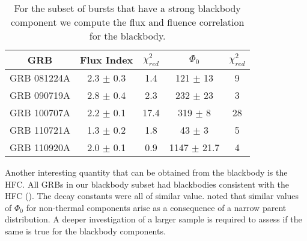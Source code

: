 \begin{table}[h!]
\centering
\begin{tabular}{c| c c c c}
GRB & Flux Index & $\chi^2_{red}$ & $\Phi_0$ & $\chi^2_{red}$ \\
\hline \hline
GRB 081224A & 2.3 $\pm$ 0.3 & 1.4 & 121 $\pm$ 13 & 9 \\ 

GRB 090719A & 2.8 $\pm$ 0.4 & 2.3 & 232 $\pm$ 23 & 3 \\ 

GRB 100707A & 2.2 $\pm$ 0.1 & 17.4 & 319 $\pm$ 8 & 28 \\ 

GRB 110721A & 1.3 $\pm$ 0.2 & 1.8 & 43 $\pm$ 3 & 5 \\ 

GRB 110920A & 2.0 $\pm$ 0.1 & 0.9 & 1147 $\pm$ 21.7 & 4 \\ 



\end{tabular}
\caption{For the subset of bursts that have a strong blackbody component we compute the flux and fluence correlation for the blackbody.}
\label{tab:bbCor}
\end{table}

Another interesting quantity that can be obtained from the blackbody
is the HFC. All GRBs in our blackbody subset had blackbodies
consistent with the HFC (). The decay
constants were all of similar value. \cite{Crider:1999} noted that
similar values of $\Phi_0$ for non-thermal components arise as a
consequence of a narrow parent distribution. A deeper investigation of
a larger sample is required to assess if the same is true for the
blackbody components.


